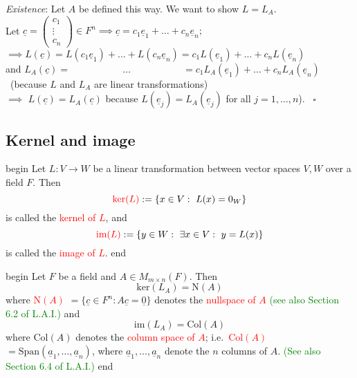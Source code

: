 \documentclass[
  12pt,
  a4paper,
  twoside]{article}
\theoremstyle{plain}
\theoremstyle{definition}
\begin{document}
\emph{Existence}: Let \(A\) be defined this way. We want to show \(L = L_{A}\).\\
Let \(\underline{c} = \begin{pmatrix} c_{1} \\ \vdots \\ c_{n} \end{pmatrix} \in F^{n} \implies \underline{c} = c_{1} \underline{e}_{1} + \dots + c_{n} \underline{e}_{n};\)\\
\(\implies L( \underline{c}) = L(c_{1} \underline{e}_{1}) + \dots + L(c_{n} \underline{e}_{n}) = c_{1}L( \underline{e}_{1}) + \dots + c_{n}L( \underline{e}_{n})\)\\
\hspace*{0.333em}\hspace*{0.333em}\hspace*{0.333em}\hspace*{0.333em}and \(L_{A}( \underline{c}) = \phantom{L(c_{1} \underline{e}_{1}) +} \dots \phantom{L(c_{1} \underline{e}_{1}) +} = c_{1}L_{A}( \underline{e}_{1}) + \dots + c_{n}L_{A}( \underline{e}_{n})\)\\
\hspace*{0.333em}\hfill~{(because \(L\) and \(L_{A}\) are linear transformations)}\\
\(\implies\) \(L( \underline{c}) = L_{A}( \underline{c})\) because \(L( \underline{e}_{j}) = L_{A}( \underline{e}_{j})\) for all \(j = 1, \dots, n\)).
\hfill~{\(\square\)}

\hypertarget{ss-kernel-and-image}{%
\subsection{Kernel and image}\label{ss-kernel-and-image}}

\csname begin\label{cnj:defn-ker-im}
Let \(L: V \to W\) be a linear transformation between vector spaces \(V,W\) over a field \(F\). Then
\[ {\color{red}{\mathrm{ker}(L)}} := \{ x \in V : \ L(x)= 0_{W} \} \]
is called the \textcolor{red}{kernel of $L$}, and
\[ {\color{red}{\mathrm{im}(L)}}:= \{ y \in W : \ \exists x \in V : \ y = L(x) \} \]
is called the \textcolor{red}{image of $L$}.
\csname end

\csname begin\label{cnj:rmrk-ker-im-matrix}
Let \(F\) be a field and \(A \in M_{m \times n}(F)\). Then
\[ \mathrm{ker}(L_{A}) = \mathrm{N}(A) \]
where \textcolor{red}{$\mathrm{N}(A)$} \(= \{ \underline{c} \in F^{n} : A \underline{c} = \underline{0} \}\) denotes the \textcolor{red}{nullspace of $A$} \textcolor{green}{(see also Section 6.2 of L.A.I.)} and
\[ \mathrm{im}(L_{A}) = \mathrm{Col}(A) \]
where \(\mathrm{Col}(A)\) denotes the \textcolor{red}{column space of $A$}; i.e.~\textcolor{red}{$\mathrm{Col}(A)$} \(= \mathrm{Span}(\underline{a}_{1}, \dots, \underline{a}_{n})\), where \(\underline{a}_{1}, \dots, \underline{a}_{n}\) denote the \(n\) columns of \(A\). \textcolor{green}{(See also Section 6.4 of L.A.I.)}
\csname end
\end{document}
